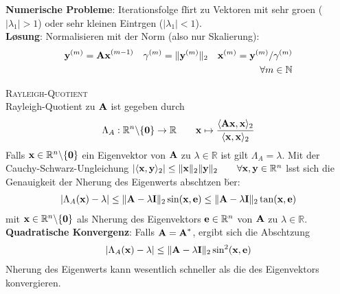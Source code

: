 

\textbf{Numerische Probleme}: Iterationsfolge f\u hrt zu Vektoren mit sehr gro\s en ($|\lambda_1|>1$) oder sehr kleinen Eintr\a gen ($|\lambda_1|<1$).\\
\textbf{L\o sung}: Normalisieren mit der Norm (also nur Skalierung):
\begin{align*}
\mbox{\bf y}^{(m)} = \mbox{\bf Ax}^{(m-1)} \quad \gamma^{(m)}= \Vert \mbox{\bf y}^{(m)} \Vert_2 \quad \mbox{\bf x}^{(m)} = \mbox{\bf y}^{(m)}/\gamma^{(m)} \\ \forall m\in \mathbb{N}
\end{align*}

\textsc{Rayleigh-Quotient}\\
Rayleigh-Quotient zu $\mbox{\bf A}$ ist gegeben durch
\begin{align*}
\Lambda_A: \mathbb{R}^{n} \backslash \{\mbox{\bf 0}\} \rightarrow \mathbb{R} \qquad \mbox{\bf x} \mapsto \frac{\langle \mbox{\bf Ax}, \mbox{\bf x} \rangle_2}{\langle \mbox{\bf x}, \mbox{\bf x} \rangle_2}
\end{align*}
Falls $\mbox{\bf x}\in \mathbb{R}^{n} \backslash \{\mbox{\bf 0}\}$ ein Eigenvektor von $\mbox{\bf A}$ zu $\lambda \in \mathbb{R}$ ist gilt $\Lambda_A = \lambda$. Mit der Cauchy-Schwarz-Ungleichung $|\langle \mbox{\bf x}, \mbox{\bf y} \rangle_2| \leq \Vert\mbox{\bf x} \Vert_2\Vert\mbox{\bf y} \Vert_2 \qquad \forall \mbox{\bf x},\mbox{\bf y} \in \mathbb{R}^{n}$ l\a sst sich die Genauigkeit der N\a herung des Eigenwerts absch\a tzen \u ber:
\begin{align*}
|\Lambda_A(\mbox{\bf x}) - \lambda| \leq \Vert \mbox{\bf A} - \lambda \mbox{\bf I} \Vert_2 \sin(\mbox{\bf x},\mbox{\bf e}) \leq \Vert \mbox{\bf A} -\lambda \mbox{\bf I} \Vert_2 \tan(\mbox{\bf x}, \mbox{\bf e})
\end{align*}
mit $\mbox{\bf x} \in \mathbb{R}^{n} \backslash \{\mbox{\bf 0}\}$ als N\a herung des Eigenvektors $\mbox{\bf e}\in \mathbb{R}^{n}$ von $\mbox{\bf A}$ zu $\lambda \in \mathbb{R}$.\\

\textbf{Quadratische Konvergenz}: Falls $\mbox{\bf A}=\mbox{\bf A}^*$, ergibt sich die Absch\a tzung\begin{align*}
|\Lambda_A(\mbox{\bf x}) - \lambda| \leq \Vert \mbox{\bf A}- \lambda \mbox{\bf I} \Vert_2 \sin^2(\mbox{\bf x},\mbox{\bf e})
\end{align*}
N\a herung des Eigenwerts kann wesentlich schneller  als die des Eigenvektors konvergieren.\vspace{0.2cm}

